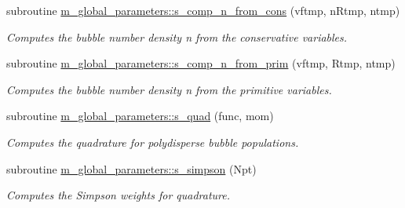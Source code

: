 \begin{DoxyCompactItemize}
\item 
subroutine \hyperlink{namespacem__global__parameters_aac1a5a73b1eae759c913983b38047167}{m\+\_\+global\+\_\+parameters\+::s\+\_\+comp\+\_\+n\+\_\+from\+\_\+cons} (vftmp, n\+Rtmp, ntmp)
\begin{DoxyCompactList}\small\item\em Computes the bubble number density n from the conservative variables. \end{DoxyCompactList}\item 
subroutine \hyperlink{namespacem__global__parameters_acdaa3827df6fee38a3e55e8b13130c27}{m\+\_\+global\+\_\+parameters\+::s\+\_\+comp\+\_\+n\+\_\+from\+\_\+prim} (vftmp, Rtmp, ntmp)
\begin{DoxyCompactList}\small\item\em Computes the bubble number density n from the primitive variables. \end{DoxyCompactList}\item 
subroutine \hyperlink{namespacem__global__parameters_aa5a48fa9cc196136634022cfa6708213}{m\+\_\+global\+\_\+parameters\+::s\+\_\+quad} (func, mom)
\begin{DoxyCompactList}\small\item\em Computes the quadrature for polydisperse bubble populations. \end{DoxyCompactList}\item 
subroutine \hyperlink{namespacem__global__parameters_a78f4bf8bb59af4396bf11aca330463ec}{m\+\_\+global\+\_\+parameters\+::s\+\_\+simpson} (Npt)
\begin{DoxyCompactList}\small\item\em Computes the Simpson weights for quadrature. \end{DoxyCompactList}\end{DoxyCompactItemize}

